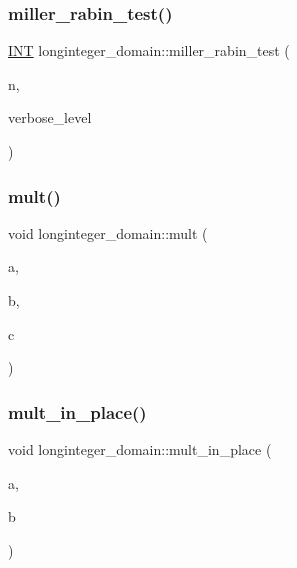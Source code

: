 \subsubsection{\texorpdfstring{miller\+\_\+rabin\+\_\+test()}{miller\_rabin\_test()}}
{\footnotesize\ttfamily \mbox{\hyperlink{galois_8h_a09fddde158a3a20bd2dcadb609de11dc}{I\+NT}} longinteger\+\_\+domain\+::miller\+\_\+rabin\+\_\+test (\begin{DoxyParamCaption}\item[{\mbox{\hyperlink{classlonginteger__object}{longinteger\+\_\+object}} \&}]{n,  }\item[{\mbox{\hyperlink{galois_8h_a09fddde158a3a20bd2dcadb609de11dc}{I\+NT}}}]{verbose\+\_\+level }\end{DoxyParamCaption})}

\mbox{\label{classlonginteger__domain_add02b012364cf88ba81d81930b284c35}} 
\subsubsection{\texorpdfstring{mult()}{mult()}}
{\footnotesize\ttfamily void longinteger\+\_\+domain\+::mult (\begin{DoxyParamCaption}\item[{\mbox{\hyperlink{classlonginteger__object}{longinteger\+\_\+object}} \&}]{a,  }\item[{\mbox{\hyperlink{classlonginteger__object}{longinteger\+\_\+object}} \&}]{b,  }\item[{\mbox{\hyperlink{classlonginteger__object}{longinteger\+\_\+object}} \&}]{c }\end{DoxyParamCaption})}

\mbox{\label{classlonginteger__domain_a999f4469b82a86e12b45a39fe7c0074d}} 
\subsubsection{\texorpdfstring{mult\+\_\+in\+\_\+place()}{mult\_in\_place()}}
{\footnotesize\ttfamily void longinteger\+\_\+domain\+::mult\+\_\+in\+\_\+place (\begin{DoxyParamCaption}\item[{\mbox{\hyperlink{classlonginteger__object}{longinteger\+\_\+object}} \&}]{a,  }\item[{\mbox{\hyperlink{classlonginteger__object}{longinteger\+\_\+object}} \&}]{b }\end{DoxyParamCaption})}

